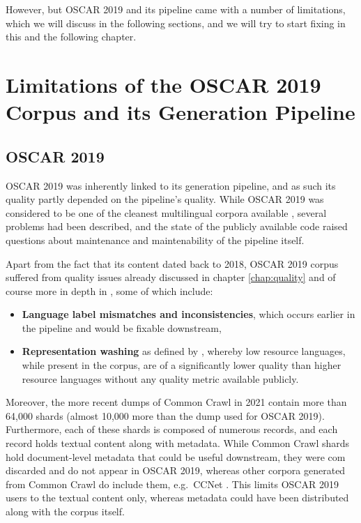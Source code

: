 However, but OSCAR 2019 and its pipeline came with a number of limitations, which we will discuss in the following sections, and we will try to start fixing in this and the following chapter.

\section{Limitations of the OSCAR 2019 Corpus and its Generation Pipeline}

\subsection{OSCAR 2019}

OSCAR 2019 was inherently linked to its generation pipeline, and as such its quality partly depended on the pipeline's quality. While OSCAR 2019 was considered to be one of the cleanest multilingual corpora available \citep{caswell-etal-2020-language,kreutzer-etal-2021-quality}, several problems had been described, and the state of the publicly available code raised questions about maintenance and maintenability of the pipeline itself.

Apart from the fact that its content dated back to 2018, OSCAR 2019 corpus suffered from quality issues already discussed in chapter \ref{chap:quality} and of course more in depth in \citep{caswell-etal-2020-language,kreutzer-etal-2021-quality}, some of which include:

\begin{itemize}
    \item \textbf{Language label mismatches and inconsistencies}, which occurs earlier in the pipeline and would be fixable downstream,
    \item \textbf{Representation washing} as defined by \citet{kreutzer-etal-2021-quality}, whereby low resource languages, while present in the corpus, are of a significantly lower quality than higher resource languages without any quality metric available publicly.
\end{itemize}

Moreover, the more recent dumps of Common Crawl in 2021 contain more than 64,000 shards (almost 10,000 more than the dump used for OSCAR 2019). Furthermore, each of these shards is composed of numerous records, and each record holds textual content along with metadata. While Common Crawl shards hold document-level metadata that could be useful downstream, they were com discarded and do not appear in OSCAR 2019, whereas other corpora generated from Common Crawl do include them, e.g.~CCNet \citep{wenzek-etal-2020-ccnet}. This limits OSCAR 2019 users to the textual content only, whereas metadata could have been distributed along with the corpus itself.

